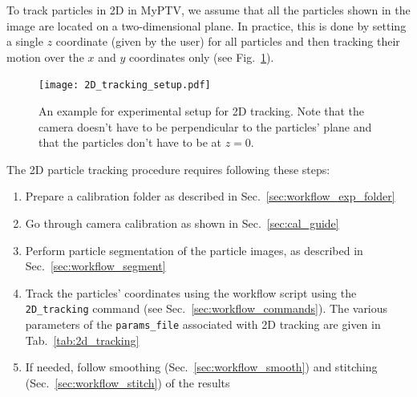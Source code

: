 \documentclass[10pt,a4paper]{article}
\begin{document}
To track particles in 2D in MyPTV, we assume that all the particles shown in the image are located on a two-dimensional plane. In practice, this is done by setting a single $z$ coordinate (given by the user) for all particles and then tracking their motion over the $x$ and $y$ coordinates only (see Fig.~\ref{fig:2D_tracking}).


\begin{figure}
	\centering
	\texttt{[image: 2D\_tracking\_setup.pdf]}
	\caption{An example for experimental setup for 2D tracking. Note that the camera doesn't have to be perpendicular to the particles' plane and that the particles don't have to be at $z=0$. \label{fig:2D_tracking}}
\end{figure}


The 2D particle tracking procedure requires following these steps:
%
\begin{enumerate}
	\item Prepare a calibration folder as described in Sec.~\ref{sec:workflow_exp_folder}
	\item Go through camera calibration as shown in Sec.~\ref{sec:cal_guide}
	\item Perform particle segmentation of the particle images, as described in Sec.~\ref{sec:workflow_segment}
	\item Track the particles' coordinates using the workflow script using the \texttt{2D\_tracking} command (see Sec.~\ref{sec:workflow_commands}). The various parameters of the \texttt{params\_file} associated with 2D tracking are given in Tab.~\ref{tab:2d_tracking}
	\item If needed, follow smoothing (Sec.~\ref{sec:workflow_smooth}) and stitching (Sec.~\ref{sec:workflow_stitch}) of the results
\end{enumerate}
%
\end{document}
